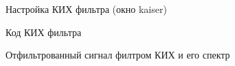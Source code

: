 \documentclass[12pt,a4paper]{scrartcl}
\begin{document}
\begin{figure}[h!]
\caption{Настройка КИХ фильтра (окно kaiser)}
\end{figure}

\begin{figure}[h!]
\caption{Код КИХ фильтра}
\end{figure}

\begin{figure}[h!]
\caption{Отфильтрованный сигнал филтром КИХ и его спектр}
\end{figure}
\end{document}

